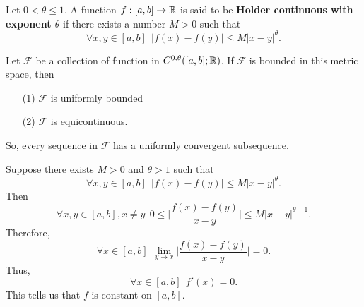 \begin{definition}\label{Holder Continous functions}
    Let \( 0 < \theta \leq 1  \). A function \( f: [a,b] \to \mathbb{R}  \) is said to be \textbf{Holder continuous with exponent \( \theta \)} if there exists a number \( M > 0  \) such that 
    \[  \forall x ,y \in [a,b] \ \ | f(x) - f(y) |  \leq M |  x-  y  |^{\theta}. \]
\end{definition}


\begin{remark}
    Let \( \mathcal{F} \) be a collection of function in \( C^{0,\theta}([a,b]; \mathbb{R}) \). If \( \mathcal{F} \) is bounded in this metric space, then 
    \begin{enumerate}
        \item[(1)] \( \mathcal{F} \) is uniformly bounded
        \item[(2)] \( \mathcal{F} \) is equicontinuous.
    \end{enumerate}
    So, every sequence in \( \mathcal{F} \) has a uniformly convergent subsequence.
\end{remark}

\begin{remark}
    Suppose there exists \( M > 0  \) and \( \theta > 1  \) such that 
    \[  \forall x,y \in [a,b] \ \ | f(x) - f(y) |  \leq M | x- y  |^{\theta}.  \]
    Then 
    \[  \forall x,y \in [a,b], x \neq y \ \ 0 \leq \Big| \frac{ f(x) - f(y) }{ x - y  }  \Big|  \leq M |  x -y  |^{\theta - 1}.  \]
    Therefore, 
    \[  \forall x \in [a,b] \ \ \lim_{ y \to x }  \Big| \frac{ f(x) - f(y) }{ x - y  }  \Big|  = 0.   \]
    Thus, 
    \[  \forall x \in [a,b] \ \ f'(x ) = 0.  \]
    This tells us that \( f  \) is constant on \( [a,b] \).
\end{remark}

